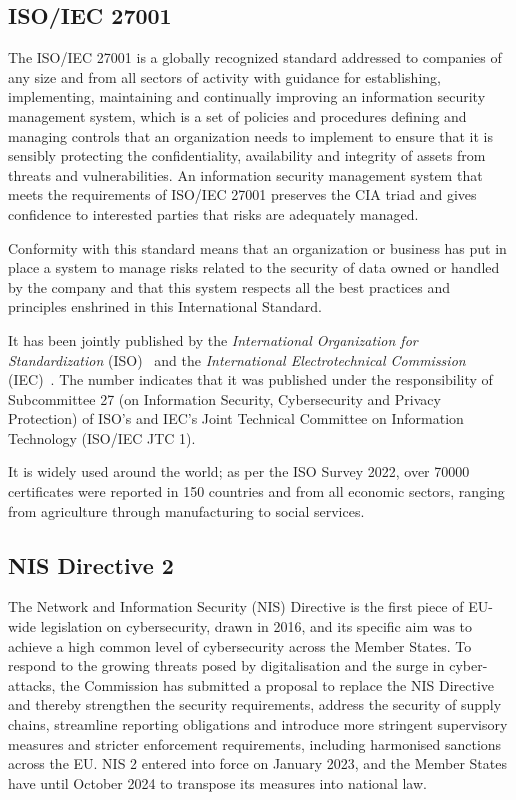 \subsection{ISO/IEC 27001}

The ISO/IEC 27001 is a globally recognized standard addressed to companies of any size and from all sectors of activity with guidance for establishing, implementing, maintaining and continually improving an information security management system, which is a set of policies and procedures defining and managing controls that an organization needs to implement to ensure that it is sensibly protecting the confidentiality, availability and integrity of assets from threats and vulnerabilities. An information security management system that meets the requirements of ISO/IEC 27001 preserves the CIA triad and gives confidence to interested parties that risks are adequately managed.

Conformity with this standard means that an organization or business has put in place a system to manage risks related to the security of data owned or handled by the company and that this system respects all the best practices and principles enshrined in this International Standard.

It has been jointly published by the \textit{International Organization for Standardization} (ISO)~\cite{iso} and the \textit{International Electrotechnical Commission} (IEC)~\cite{iec}. The number indicates that it was published under the responsibility of Subcommittee 27 (on Information Security, Cybersecurity and Privacy Protection) of ISO's and IEC's Joint Technical Committee on Information Technology (ISO/IEC JTC 1).

It is widely used around the world; as per the ISO Survey 2022, over 70000 certificates were reported in 150 countries and from all economic sectors, ranging from agriculture through manufacturing to social services.~\cite{iso-27001}

\subsection{NIS Directive 2}
\label{sec:nis-directive-2}

The Network and Information Security (NIS) Directive is the first piece of EU-wide legislation on cybersecurity, drawn in 2016, and its specific aim was to achieve a high common level of cybersecurity across the Member States. To respond to the growing threats posed by digitalisation and the surge in cyber-attacks, the Commission has submitted a proposal to replace the NIS Directive and thereby strengthen the security requirements, address the security of supply chains, streamline reporting obligations and introduce more stringent supervisory measures and stricter enforcement requirements, including harmonised sanctions across the EU. NIS 2 entered into force on January 2023, and the Member States have until October 2024 to transpose its measures into national law.

